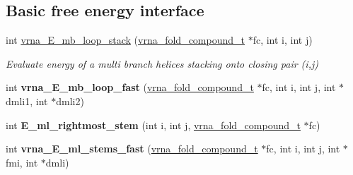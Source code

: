 \subsection*{Basic free energy interface}
\begin{DoxyCompactItemize}
\item 
int \mbox{\hyperlink{group__eval__loops__mb_ga91af6d5fcb0aef243a4071cf9e718020}{vrna\+\_\+\+E\+\_\+mb\+\_\+loop\+\_\+stack}} (\mbox{\hyperlink{group__fold__compound_ga1b0cef17fd40466cef5968eaeeff6166}{vrna\+\_\+fold\+\_\+compound\+\_\+t}} $\ast$fc, int i, int j)
\begin{DoxyCompactList}\small\item\em Evaluate energy of a multi branch helices stacking onto closing pair (i,j) \end{DoxyCompactList}\item 
\mbox{\label{group__eval__loops__mb_ga2fb0e2d1e0d6280f4e8e7f12b345c334}} 
int {\bfseries vrna\+\_\+\+E\+\_\+mb\+\_\+loop\+\_\+fast} (\mbox{\hyperlink{group__fold__compound_ga1b0cef17fd40466cef5968eaeeff6166}{vrna\+\_\+fold\+\_\+compound\+\_\+t}} $\ast$fc, int i, int j, int $\ast$dmli1, int $\ast$dmli2)
\item 
\mbox{\label{group__eval__loops__mb_gabbf601fe425b60dbc6599865bb8a1ee3}} 
int {\bfseries E\+\_\+ml\+\_\+rightmost\+\_\+stem} (int i, int j, \mbox{\hyperlink{group__fold__compound_ga1b0cef17fd40466cef5968eaeeff6166}{vrna\+\_\+fold\+\_\+compound\+\_\+t}} $\ast$fc)
\item 
\mbox{\label{group__eval__loops__mb_ga9e000f5f16177b8696bde5ed4db96d18}} 
int {\bfseries vrna\+\_\+\+E\+\_\+ml\+\_\+stems\+\_\+fast} (\mbox{\hyperlink{group__fold__compound_ga1b0cef17fd40466cef5968eaeeff6166}{vrna\+\_\+fold\+\_\+compound\+\_\+t}} $\ast$fc, int i, int j, int $\ast$fmi, int $\ast$dmli)
\end{DoxyCompactItemize}
